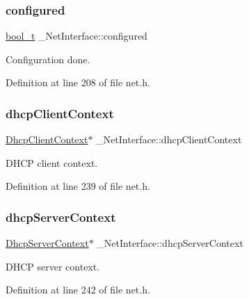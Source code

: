 \subsubsection{\texorpdfstring{configured}{configured}}
{\footnotesize\ttfamily \hyperlink{compiler__port_8h_a812d16e5494522586b3784e55d479912}{bool\+\_\+t} \+\_\+\+Net\+Interface\+::configured}



Configuration done. 



Definition at line 208 of file net.\+h.

\mbox{\label{struct__NetInterface_a77506d7bf0892b26346603e799e8b2b9}} 
\subsubsection{\texorpdfstring{dhcp\+Client\+Context}{dhcpClientContext}}
{\footnotesize\ttfamily \hyperlink{dhcp__client_8h_aa593bac3e82a5a4f433a169cb8abd8d9}{Dhcp\+Client\+Context}$\ast$ \+\_\+\+Net\+Interface\+::dhcp\+Client\+Context}



D\+H\+CP client context. 



Definition at line 239 of file net.\+h.

\mbox{\label{struct__NetInterface_aed4d56cf8a6426e709913bd4cbfbf138}} 
\subsubsection{\texorpdfstring{dhcp\+Server\+Context}{dhcpServerContext}}
{\footnotesize\ttfamily \hyperlink{structDhcpServerContext}{Dhcp\+Server\+Context}$\ast$ \+\_\+\+Net\+Interface\+::dhcp\+Server\+Context}



D\+H\+CP server context. 



Definition at line 242 of file net.\+h.

